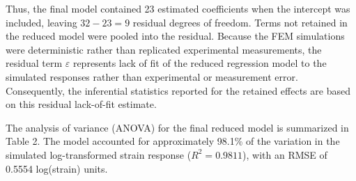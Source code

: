 \documentclass[fleqn,10pt]{wlscirep}
\begin{document}
Thus, the final model contained 23 estimated coefficients when the intercept was included, leaving $32-23=9$ residual degrees of freedom. Terms not retained in the reduced model were pooled into the residual. Because the FEM simulations were deterministic rather than replicated experimental measurements, the residual term $\varepsilon$ represents lack of fit of the reduced regression model to the simulated responses rather than experimental or measurement error. Consequently, the inferential statistics reported for the retained effects are based on this residual lack-of-fit estimate.

The analysis of variance (ANOVA) for the final reduced model is summarized in Table 2. The model accounted for approximately 98.1\% of the variation in the simulated log-transformed strain response ($R^2=0.9811$), with an RMSE of 0.5554 log(strain) units.
\end{document}
